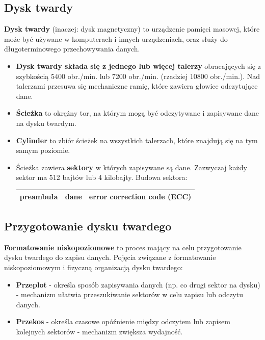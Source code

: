 \documentclass{article}
\begin{document}
\subsection{Dysk twardy}
\textbf{Dysk twardy} (inaczej: dysk magnetyczny) to urządzenie pamięci masowej, które może być używane w komputerach i innych urządzeniach, oraz służy do długoterminowego przechowywania danych.

\begin{itemize}
\item \textbf{Dysk twardy składa się z jednego lub więcej talerzy} obracających się z szybkością 5400 obr./min. lub 7200 obr./min. (rzadziej 10800 obr./min.). Nad talerzami przesuwa się mechaniczne ramię, które zawiera głowice odczytujące dane.
\item \textbf{Ścieżka} to okrężny tor, na którym mogą być odczytywane i zapisywane
dane na dysku twardym.
\item \textbf{Cylinder} to zbiór ścieżek na wszystkich talerzach, które znajdują się na tym samym poziomie. 
\item Ścieżka zawiera \textbf{sektory} w których zapisywane są dane. Zazwyczaj każdy sektor ma 512 bajtów lub 4 kilobajty.
Budowa sektora:
\begin{table}[ht]
\centering
\begin{tabular}{|c|c|c|}
\hline
\textbf{preambuła} & \textbf{dane} & \textbf{error correction code (ECC)} \\
\hline
\end{tabular}
\end{table}
\end{itemize}

\subsection{Przygotowanie dysku twardego}
\textbf{Formatowanie niskopoziomowe} to proces mający na celu przygotowanie dysku twardego do zapisu danych. Pojęcia związane z formatowanie niskopoziomowym i fizyczną organizacją dysku twardego:
\begin{itemize}
    \item \textbf{Przeplot} - określa sposób zapisywania danych (np. co drugi sektor na dysku) - mechanizm ułatwia przeszukiwanie sektorów w celu zapisu lub odczytu danych.
    \item \textbf{Przekos} - określa czasowe opóźnienie między odczytem lub zapisem kolejnych sektorów - mechanizm zwiększa wydajność.
\end{itemize}
\end{document}
